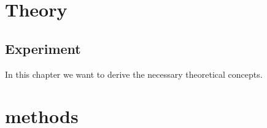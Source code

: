 \documentclass[Thesis_main]{subfiles}
\begin{document}
	\section{Theory}
	\subsection{Experiment}
	In this chapter we want to derive the necessary theoretical concepts.
	\section{methods}
\end{document}
